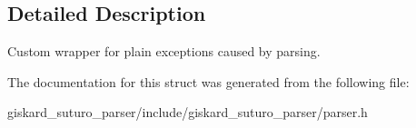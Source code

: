 \subsection{Detailed Description}
Custom wrapper for plain exceptions caused by parsing. 

The documentation for this struct was generated from the following file\-:\begin{DoxyCompactItemize}
\item 
giskard\-\_\-suturo\-\_\-parser/include/giskard\-\_\-suturo\-\_\-parser/parser.\-h\end{DoxyCompactItemize}
